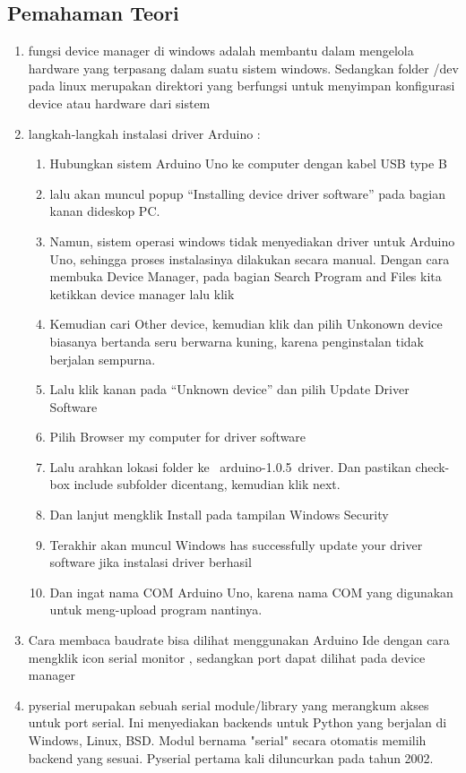 \subsection{Pemahaman Teori}
\begin{enumerate}
    \item fungsi device manager di windows adalah membantu dalam mengelola hardware yang terpasang dalam suatu sistem windows. Sedangkan folder /dev pada linux merupakan direktori yang berfungsi untuk menyimpan konfigurasi device atau hardware dari sistem
    \item langkah-langkah instalasi driver Arduino :
    \begin{enumerate}
        \item Hubungkan sistem Arduino Uno ke computer dengan kabel USB type B
        \item lalu akan muncul popup “Installing device driver software” pada bagian kanan dideskop PC.
        \item Namun, sistem operasi windows tidak menyediakan driver untuk Arduino Uno, sehingga proses instalasinya dilakukan secara manual. Dengan cara membuka Device Manager, pada bagian Search Program and Files kita ketikkan device manager lalu klik
        \item Kemudian cari Other device, kemudian klik dan pilih Unkonown device biasanya bertanda seru berwarna kuning, karena penginstalan tidak berjalan sempurna.
        \item Lalu klik kanan pada “Unknown device” dan pilih Update Driver Software
        \item Pilih Browser my computer for driver software
        \item Lalu arahkan lokasi folder ke \ arduino-1.0.5\ driver. Dan pastikan check-box include subfolder dicentang, kemudian klik next.
        \item Dan lanjut mengklik Install pada tampilan Windows Security
        \item Terakhir akan muncul Windows has successfully update your driver software jika instalasi driver berhasil
        \item Dan ingat nama COM Arduino Uno, karena nama COM yang digunakan untuk meng-upload program nantinya.
    \end{enumerate}
    \item Cara membaca baudrate bisa dilihat menggunakan Arduino Ide dengan cara mengklik icon serial monitor , sedangkan port dapat  dilihat pada device manager
    \item pyserial merupakan sebuah serial module/library yang merangkum akses untuk port serial. Ini menyediakan backends untuk Python yang berjalan di Windows, Linux, BSD. Modul bernama "serial" secara otomatis memilih backend yang sesuai. Pyserial pertama kali diluncurkan pada tahun 2002.

\end{enumerate}
